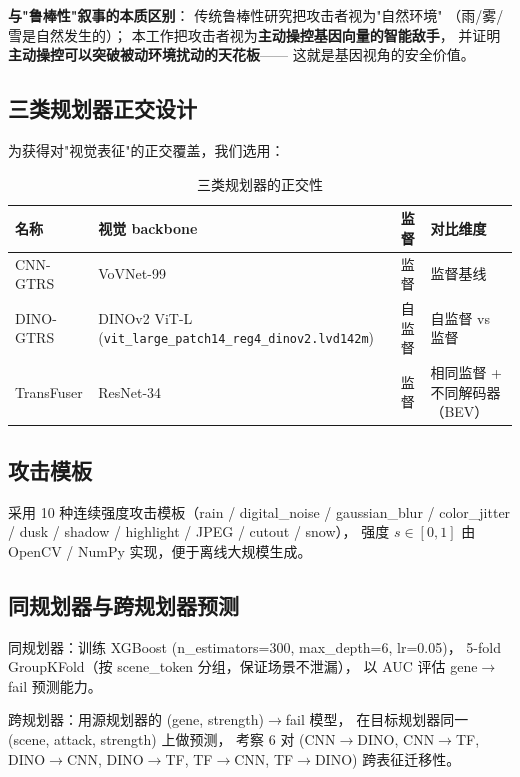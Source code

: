 \documentclass[a4paper,12pt,fontset=fandol]{ctexart}
\newcommand{\planner}[1]{\textsf{#1}}
\begin{document}
\noindent\textbf{与"鲁棒性"叙事的本质区别}：
传统鲁棒性研究把攻击者视为"自然环境"
（雨/雾/雪是自然发生的）；
本工作把攻击者视为\textbf{主动操控基因向量的智能敌手}，
并证明 \textbf{主动操控可以突破被动环境扰动的天花板}——
这就是基因视角的安全价值。

\subsection{三类规划器正交设计}

为获得对"视觉表征"的正交覆盖，我们选用：

\begin{table}[H]
\centering
\small
\caption{三类规划器的正交性}
\begin{tabularx}{\linewidth}{lXcX}
\toprule
\textbf{名称} & \textbf{视觉 backbone} & \textbf{监督} & \textbf{对比维度} \\
\midrule
\planner{CNN-GTRS} & VoVNet-99 & 监督 & 监督基线 \\
\planner{DINO-GTRS} & DINOv2 ViT-L
                    (\texttt{vit\_large\_patch14\_reg4\_dinov2.lvd142m}) & 自监督 & 自监督 vs 监督 \\
\planner{TransFuser} & ResNet-34 & 监督 & 相同监督 + 不同解码器（BEV）\\
\bottomrule
\end{tabularx}
\end{table}

\subsection{攻击模板}

采用 10 种连续强度攻击模板（rain / digital\_noise / gaussian\_blur /
color\_jitter / dusk / shadow / highlight / JPEG / cutout / snow），
强度 $s\!\in\![0,1]$ 由 OpenCV / NumPy 实现，便于离线大规模生成。

\subsection{同规划器与跨规划器预测}

同规划器：训练 XGBoost (n\_estimators=300, max\_depth=6, lr=0.05)，
5-fold GroupKFold（按 scene\_token 分组，保证场景不泄漏），
以 AUC 评估 gene$\to$fail 预测能力。

跨规划器：用源规划器的 (gene, strength)$\to$fail 模型，
在目标规划器同一 (scene, attack, strength) 上做预测，
考察 6 对 (CNN$\to$DINO, CNN$\to$TF, DINO$\to$CNN, DINO$\to$TF,
TF$\to$CNN, TF$\to$DINO) 跨表征迁移性。
\end{document}
